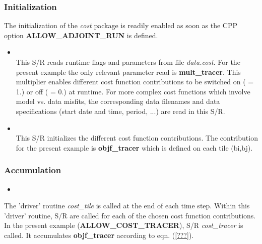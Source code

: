 \subsubsection{Initialization}
%
The initialization of the {\it cost} package is readily enabled
as soon as the CPP option {\bf ALLOW\_ADJOINT\_RUN} is defined.
%
\begin{itemize}
%
\item 
{}
\\
This S/R 
reads runtime flags and parameters from file {\it data.cost}.
For the present example the only relevant parameter read
is {\bf mult\_tracer}. This multiplier enables different
cost function contributions to be switched on
( = 1.) or off ( = 0.) at runtime.
For more complex cost functions which involve model vs. data
misfits, the corresponding data filenames and data
specifications (start date and time, period, ...) are read
in this S/R.
%
\item 
{}
\\
This S/R 
initializes the different cost function contributions.
The contribution for the present example is {\bf objf\_tracer}
which is defined on each tile (bi,bj).
%
\end{itemize}
%
\subsubsection{Accumulation}
%
\begin{itemize}
%
\item 
{}
\end{itemize}
%
The 'driver' routine
{\it cost\_tile} is called at the end of each time step.
Within this 'driver' routine, S/R are called for each of
the chosen cost function contributions.
In the present example ({\bf ALLOW\_COST\_TRACER}),
S/R {\it cost\_tracer} is called.
It accumulates {\bf objf\_tracer} according to eqn. (\ref{???}).
%
